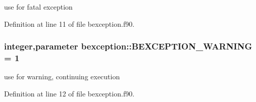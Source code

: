 use for fatal exception 



Definition at line 11 of file bexception.f90.

\hypertarget{namespacebexception_a8f7fabc18e6fc4a081836a0e0401b94c}{
\subsubsection[{BEXCEPTION\_\-WARNING}]{\setlength{\rightskip}{0pt plus 5cm}integer,parameter {\bf bexception::BEXCEPTION\_\-WARNING} = 1}}
\label{namespacebexception_a8f7fabc18e6fc4a081836a0e0401b94c}


use for warning, continuing execution 



Definition at line 12 of file bexception.f90.

